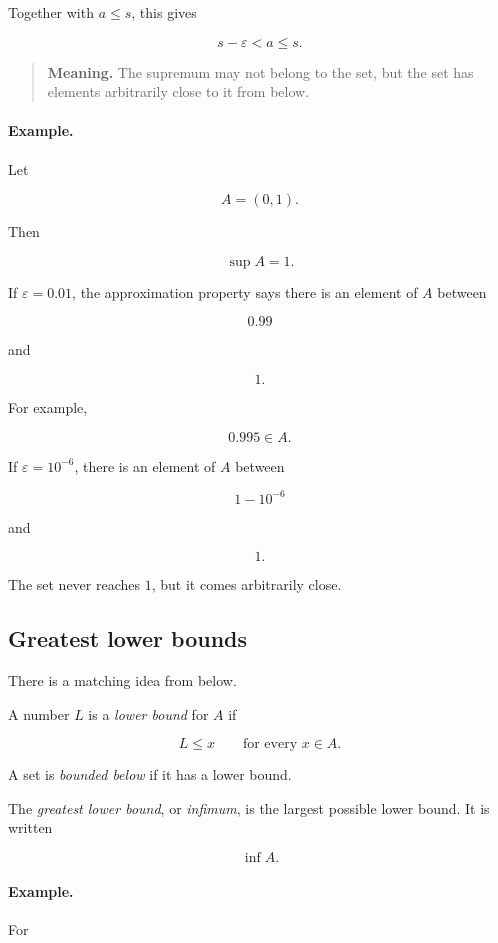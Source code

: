 Together with \(a\le s\), this gives

\[
s-\varepsilon<a\le s.
\]

\begin{quote}
\textbf{Meaning.}
The supremum may not belong to the set, but the set has elements arbitrarily close to
it from below.
\end{quote}

\paragraph{Example.}
Let

\[
A=(0,1).
\]

Then

\[
\sup A=1.
\]

If \(\varepsilon=0.01\), the approximation property says there is an element of \(A\)
between

\[
0.99
\]

and

\[
1.
\]

For example,

\[
0.995\in A.
\]

If \(\varepsilon=10^{-6}\), there is an element of \(A\) between

\[
1-10^{-6}
\]

and

\[
1.
\]

The set never reaches \(1\), but it comes arbitrarily close.

\subsection{Greatest lower bounds}
\label{appsubsec:greatest-lower-bounds}

There is a matching idea from below.

A number \(L\) is a \emph{lower bound} for \(A\) if

\[
L\le x
\qquad\text{for every }x\in A.
\]

A set is \emph{bounded below} if it has a lower bound.

The \emph{greatest lower bound}, or \emph{infimum}, is the largest possible lower
bound.  It is written

\[
\inf A.
\]

\paragraph{Example.}
For


